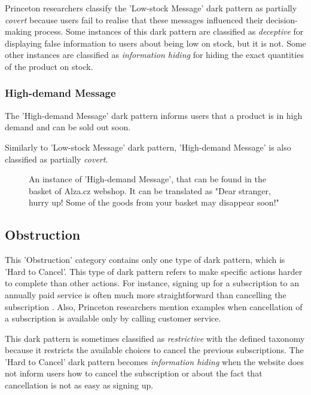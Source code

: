         Princeton researchers classify the 'Low-stock Message' dark pattern as partially \emph{covert} because users fail to realise that these messages influenced their decision-making process. Some instances of this dark pattern are classified as \emph{deceptive} for displaying false information to users about being low on stock, but it is not. Some other instances are classified as \emph{information hiding} for hiding the exact quantities of the product on stock.

        \subsubsection{High-demand Message}
        The 'High-demand Message' dark pattern informs users that a product is in high demand and can be sold out soon.

        Similarly to 'Low-stock Message' dark pattern, 'High-demand Message' is also classified as partially \emph{covert}.

        \begin{figure}[ht]
            \centering
            \caption{An instance of 'High-demand Message', that can be found in the basket of Alza.cz webshop. It can be translated as "Dear stranger, hurry up! Some of the goods from your basket may disappear soon!"}
            \label{fig:high-demand-message-alza}
        \end{figure}

    \subsection{Obstruction}
    This 'Obstruction' category contains only one type of dark pattern, which is 'Hard to Cancel'. This type of dark pattern refers to make specific actions harder to complete than other actions. For instance, signing up for a subscription to an annually paid service is often much more straightforward than cancelling the subscription \cite{unbounce-subscription}. Also, Princeton researchers mention examples when cancellation of a subscription is available only by calling customer service\cite{dark-patterns-at-scale}.

    This dark pattern is sometimes classified as \emph{restrictive} with the defined taxonomy because it restricts the available choices to cancel the previous subscriptions. The 'Hard to Cancel' dark pattern becomes \emph{information hiding} when the website does not inform users how to cancel the subscription or about the fact that cancellation is not as easy as signing up.

